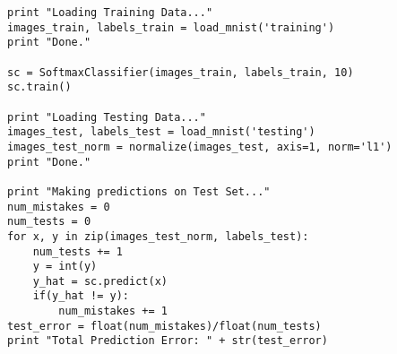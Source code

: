 \documentclass{article}
\begin{document}
\begin{spacing}{1.1}
\begin{lstlisting}
print "Loading Training Data..."
images_train, labels_train = load_mnist('training')
print "Done."

sc = SoftmaxClassifier(images_train, labels_train, 10)
sc.train()

print "Loading Testing Data..."
images_test, labels_test = load_mnist('testing')
images_test_norm = normalize(images_test, axis=1, norm='l1')
print "Done."

print "Making predictions on Test Set..."
num_mistakes = 0
num_tests = 0
for x, y in zip(images_test_norm, labels_test):
    num_tests += 1
    y = int(y)
    y_hat = sc.predict(x)
    if(y_hat != y):
        num_mistakes += 1
test_error = float(num_mistakes)/float(num_tests)
print "Total Prediction Error: " + str(test_error)
\end{lstlisting}


\end{spacing}
\end{document}
